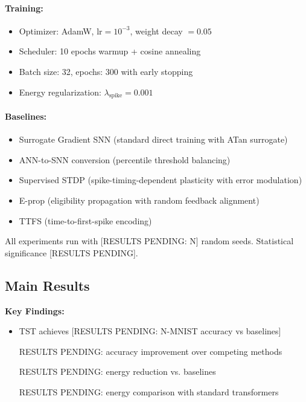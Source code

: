 \documentclass{article}
\begin{document}
\paragraph{Training:}
\begin{itemize}
    \item Optimizer: AdamW, $\text{lr}=10^{-3}$, weight decay $=0.05$
    \item Scheduler: 10 epochs warmup + cosine annealing
    \item Batch size: 32, epochs: 300 with early stopping
    \item Energy regularization: $\lambda_{\text{spike}} = 0.001$
\end{itemize}

\paragraph{Baselines:}
\begin{itemize}
    \item Surrogate Gradient SNN (standard direct training with ATan surrogate)
    \item ANN-to-SNN conversion (percentile threshold balancing)
    \item Supervised STDP (spike-timing-dependent plasticity with error modulation)
    \item E-prop (eligibility propagation with random feedback alignment)
    \item TTFS (time-to-first-spike encoding)
\end{itemize}

All experiments run with [RESULTS PENDING: N] random seeds. Statistical significance [RESULTS PENDING].

\subsection{Main Results}







\textbf{Key Findings:}
\begin{itemize}
    \item TST achieves [RESULTS PENDING: N-MNIST accuracy vs baselines]
    \item [RESULTS PENDING: accuracy improvement over competing methods]
    \item [RESULTS PENDING: energy reduction vs. baselines]
    \item [RESULTS PENDING: energy comparison with standard transformers]
\end{itemize}
\end{document}
